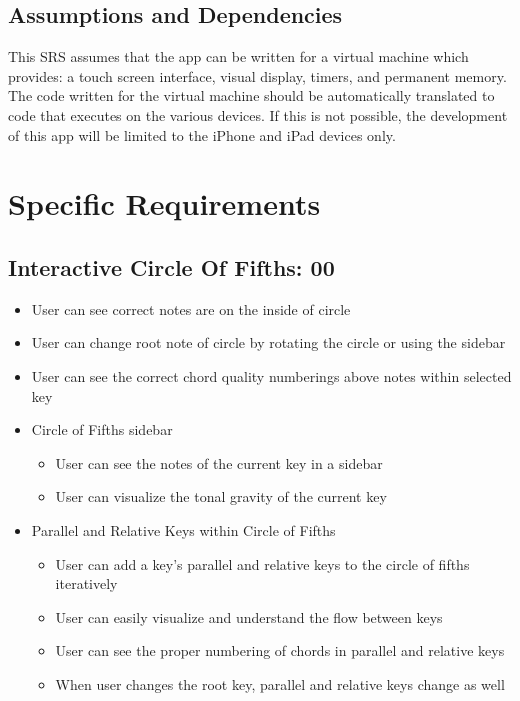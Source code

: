 \documentclass[onecolumn, draftclsnofoot,10pt, compsoc]{IEEEtran}
\begin{document}
\subsection{Assumptions and Dependencies}
\par
This SRS assumes that the app can be written for a virtual machine which provides: a touch screen interface, visual display, timers, and permanent memory.
The code written for the virtual machine should be automatically translated to code that executes on the various devices.
If this is not possible, the development of this app will be limited to the iPhone and iPad devices only.

\section{Specific Requirements}

\subsection{Interactive Circle Of Fifths: 00}
\begin{itemize}
\item User can see correct notes are on the inside of circle
\item User can change root note of circle by rotating the circle or using the sidebar
\item User can see the correct chord quality numberings above notes within selected key
\item Circle of Fifths sidebar
    \begin{itemize}
        \item User can see the notes of the current key in a sidebar
        \item User can visualize the tonal gravity of the current key
    \end{itemize}
\item Parallel and Relative Keys within Circle of Fifths
    \begin{itemize}
        \item User can add a key’s parallel and relative keys to the circle of fifths iteratively
        \item User can easily visualize and understand the flow between keys
        \item User can see the proper numbering of chords in parallel and relative keys
        \item When user changes the root key, parallel and relative keys change as well
    \end{itemize}
\end{itemize}
\end{document}
